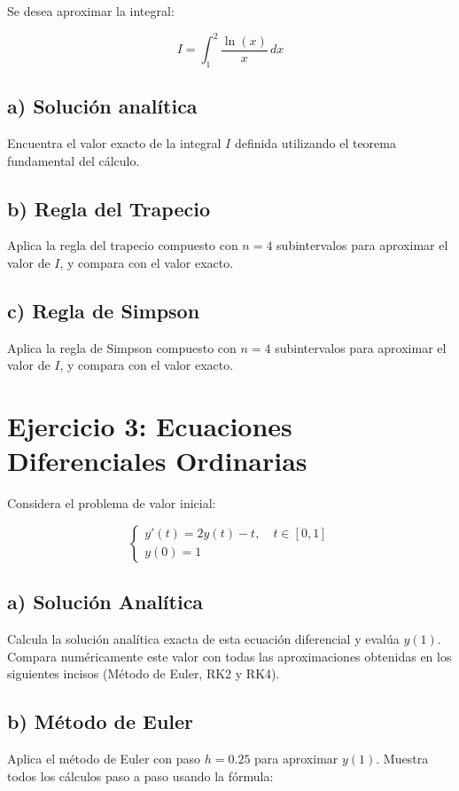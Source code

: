 \documentclass[12pt,a4paper]{article}
\begin{document}
Se desea aproximar la integral:

$$I = \int_{1}^{2} \frac{\ln(x)}{x} \, dx$$

\subsection*{a) Solución analítica}
Encuentra el valor exacto de la integral $I$ definida utilizando el teorema fundamental del cálculo.

\subsection*{b) Regla del Trapecio}
Aplica la regla del trapecio compuesto con $n = 4$ subintervalos para aproximar el valor de $I$, y compara con el valor exacto.

\subsection*{c) Regla de Simpson}
Aplica la regla de Simpson compuesto con $n = 4$ subintervalos para aproximar el valor de $I$, y compara con el valor exacto.

\section*{Ejercicio 3: Ecuaciones Diferenciales Ordinarias}

Considera el problema de valor inicial:

$$\begin{cases}
y'(t) = 2y(t) - t, \quad t \in [0, 1] \\
y(0) = 1
\end{cases}$$

\subsection*{a) Solución Analítica}
Calcula la solución analítica exacta de esta ecuación diferencial y evalúa $y(1)$. Compara numéricamente este valor con todas las aproximaciones obtenidas en los siguientes incisos (Método de Euler, RK2 y RK4).

\subsection*{b) Método de Euler}
Aplica el método de Euler con paso $h = 0.25$ para aproximar $y(1)$. Muestra todos los cálculos paso a paso usando la fórmula:
\end{document}
